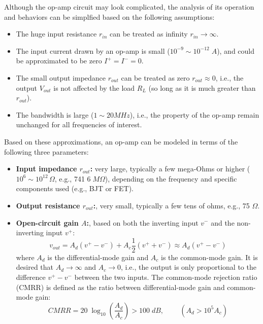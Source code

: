 \documentclass{article}
\begin{document}
Although the op-amp circuit may look complicated, the analysis of its
operation and behaviors can be simplfied based on the following assumptions:
\begin{itemize}
\item The huge input resistance $r_{in}$ can be treated as infinity 
  $r_{in}\rightarrow \infty$.
\item The input current drawn by an op-amp is small ($10^{-9}\sim10^{-12}\;A$), 
  and could be approximated to be zero $I^+=I^-=0$.
\item The small output impedance $r_{out}$ can be treated as zero $r_{out}\approx 0$,
  i.e., the output $V_{out}$ is not affected by the load $R_L$ (so long as it is
  much greater than $r_{out}$).
\item The bandwidth is large ($1 \sim 20MHz$), i.e., the property of the op-amp 
  remain unchanged for all frequencies of interest.

\end{itemize}

Based on these approximations, an op-amp can be modeled in terms of the
following three parameters:



\begin{itemize}
\item
  {\bf Input impedance $r_{out}$:} very large, typically a few mega-Ohms or
  higher ($10^6\sim 10^{12}\,\Omega$, e.g., 741 $6\;M\Omega$), depending on 
  the frequency and specific components used (e.g., BJT or FET).

\item {\bf Output resistance $r_{out}$:}, very small, typically a few tens of
  ohms, e.g., 75 $\Omega$.

\item {\bf Open-circuit gain $A$:}, based on both the inverting input $v^-$ 
  and the non-inverting input $v^+$:
  \begin{equation}
    v_{out}=A_d (v^+ - v^-)+A_c \frac{1}{2}(v^+ + v^-)\approx A_d (v^+ - v^-) 
  \end{equation}
  where $A_d$ is the differential-mode gain and $A_c$ is the common-mode gain.
  It is desired that $A_d\rightarrow \infty$ and $A_c\rightarrow 0$, i.e., the 
  output is only proportional to the difference $v^+-v^-$ between the two inputs. 
  The common-mode rejection ratio (CMRR) is defined as the ratio between 
  differential-mode gain and common-mode gain:
  \begin{equation} 
    CMRR=20\;\log_{10} \left(\frac{A_d}{A_c}\right)>100\;dB,
    \;\;\;\;\;\;\;\;(A_d>10^5 A_c) 
  \end{equation}

\end{itemize}
\end{document}
